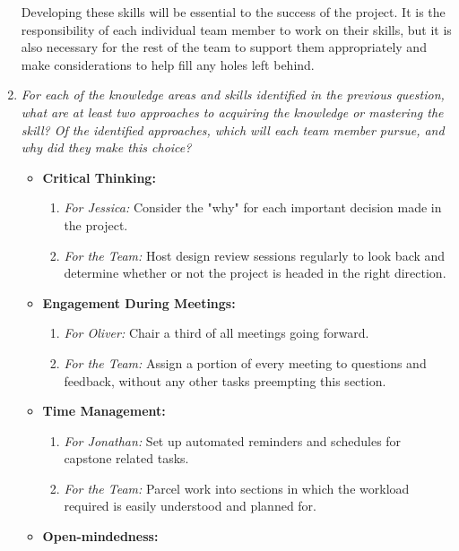 \documentclass[12pt, titlepage]{article}
\begin{document}
\begin{enumerate}
        Developing these skills will be essential to the success of the project. It is the responsibility of each individual team member to work on their skills, but it is also necessary for the rest of the team to support them appropriately and make considerations to help fill any holes left behind.

  \item \textit{For each of the knowledge areas and skills identified in the previous
          question, what are at least two approaches to acquiring the knowledge or
          mastering the skill?  Of the identified approaches, which will each team
          member pursue, and why did they make this choice?}
        \begin{itemize}
          \item \textbf{Critical Thinking:}
                \begin{enumerate}
                  \item \textit{For Jessica:} Consider the "why" for each important decision made in the project.
                  \item \textit{For the Team:} Host design review sessions regularly to look back and determine whether or not the project is headed in the right direction.
                \end{enumerate}
          \item \textbf{Engagement During Meetings:}
                \begin{enumerate}
                  \item \textit{For Oliver:} Chair a third of all meetings going forward.
                  \item \textit{For the Team:} Assign a portion of every meeting to questions and feedback, without any other tasks preempting this section.
                \end{enumerate}
          \item \textbf{Time Management:}
                \begin{enumerate}
                  \item \textit{For Jonathan:} Set up automated reminders and schedules for capstone related tasks.
                  \item \textit{For the Team:} Parcel work into sections in which the workload required is easily understood and planned for.
                \end{enumerate}
          \item \textbf{Open-mindedness:}
                \begin{enumerate}

\end{enumerate}
\end{itemize}
\end{enumerate}
\end{document}
